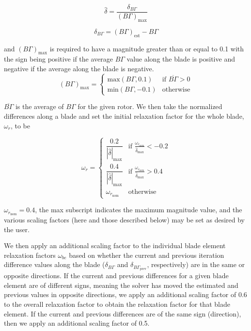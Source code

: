 \begin{equation}
    \hat{\delta} = \frac{\delta_{B\Gamma}}{(B\Gamma)_\text{max}}
\end{equation}

\where

\begin{equation}
    \delta_{B\Gamma} = (B\Gamma)_\text{est} - B\Gamma
\end{equation}

\noindent and \((B\Gamma)_\text{max}\) is required to have a magnitude greater than or equal to 0.1 with the sign being positive if the average \(B\Gamma\) value along the blade is positive and negative if the average along the blade is negative.
%
\begin{equation}
    (B\Gamma)_\text{max} =
    \begin{cases}
        \text{max}(B\Gamma,0.1) & \text{if } \overline{B\Gamma} > 0 \\
        \text{min}(B\Gamma,-0.1) & \text{otherwise}
    \end{cases}
\end{equation}

\where \(\overline{B\Gamma}\) is the average of \(B\Gamma\) for the given rotor.
%
We then take the normalized differences along a blade and set the initial relaxation factor for the whole blade, \(\omega_r\), to be

\begin{equation}
    \omega_r =
    \begin{cases}
        \dfrac{0.2}{|\hat{\delta}|_\text{max}} & \text{if } \frac{\omega_{r_\text{nom}}}{\hat{\delta}_\text{max}} < -0.2
        \\[10pt]
        \dfrac{0.4}{|\hat{\delta}|_\text{max}} & \text{if } \frac{\omega_{r_\text{nom}}}{\hat{\delta}_\text{max}} > 0.4 \\[10pt]
        \omega_{r_\text{nom}} & \text{otherwise}
    \end{cases}
\end{equation}

\where \(\omega_{r_\text{nom}}=0.4\), the max subscript indicates the maximum magnitude value, and the various scaling factors (here and those described below) may be set as desired by the user.

We then apply an additional scaling factor to the individual blade element relaxation factors \(\omega_{be}\) based on whether the current and previous iteration difference values along the blade (\(\delta_{B\Gamma}\) and \(\delta_{B\Gamma_\text{prev}}\), respectively) are in the same or opposite directions.
%
If the current and previous differences for a given blade element are of different signs, meaning the solver has moved the estimated and previous values in opposite directions, we apply an additional scaling factor of 0.6 to the overall relaxation factor to obtain the relaxation factor for that blade element.
%
If the current and previous differences are of the same sign (direction), then we apply an additional scaling factor of 0.5.

